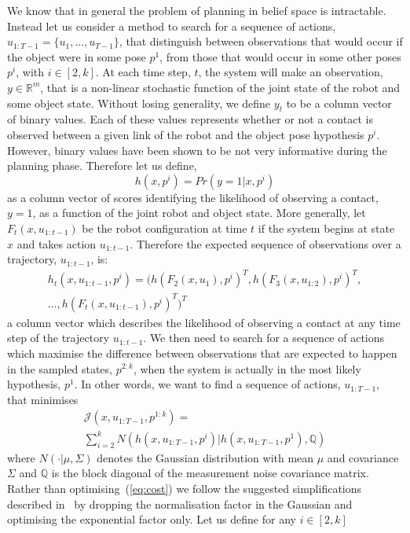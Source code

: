 We know that in general the problem of planning in belief space is intractable. Instead let us consider a method to search for a sequence of actions, $u_{1:T-1}=\{u_1,\dots,u_{T-1}\}$, that distinguish between observations that would occur if the object were in some pose $p^1$, from those that would occur in some other poses $p^i$, with $i\in[2,k]$.
At each time step, $t$, the system will make an observation, $y\in\mathbb{R}^m$, that is a non-linear stochastic function of the joint state of the robot and some object state. 
Without losing generality, we define $y_t$ to be a column vector of binary values. Each of these values represents whether or not a contact is observed between a given link of the robot and the object pose hypothesis $p^i$.
However, binary values have been shown to be not very informative during the planning phase. Therefore let us define,
$$
h(x,p^i)=Pr(y=1|x,p^i)
$$
as a column vector of scores identifying the likelihood of observing a contact, $y=1$, as a function of the joint robot and object state.
More generally, let $F_t(x,u_{1:t-1})$ be the robot configuration at time $t$ if the system begins at state $x$ and takes action $u_{1:t-1}$. Therefore the expected sequence of observations over a trajectory, $u_{1:t-1}$, is:
\begin{multline}
h_t(x,u_{1:t-1},p^i)=(h(F_2(x,u_1),p^i)^T,h(F_3(x,u_{1:2}),p^i)^T,\\ \ldots,h(F_t(x,u_{1:t-1}),p^i)^T)^T
\end{multline}
a column vector which describes the likelihood of observing a contact at any time step of the trajectory $u_{1:t-1}$.
We then need to search for a sequence of actions which maximise the difference between observations that are expected to happen in the sampled states, $p^{2:k}$, when the system is actually in the most likely hypothesis, $p^1$. In other words, we want to find a sequence of actions, $u_{1:T-1}$, that minimises
\begin{multline}\label{eq:cost}
\mathcal{J}(x,u_{1:T-1},p^{1:k})= \\ \sum_{i=2}^kN(h(x,u_{1:T-1},p^i)|h(x,u_{1:T-1},p^1),\mathbb{Q})
\end{multline}
where $N(\cdot|\mu,\Sigma)$ denotes the Gaussian distribution with mean $\mu$ and covariance $\Sigma$ and $\mathbb{Q}$ is the block diagonal of the measurement noise covariance matrix. Rather than optimising~(\ref{eq:cost}) we follow the suggested simplifications described in~\citep{bib:platt_csail_2011} by dropping the normalisation factor in the Gaussian and optimising the exponential factor only. Let us define for any $i\in[2,k]$
